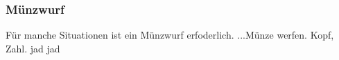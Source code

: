 
\subsubsection{Münzwurf}
Für manche Situationen ist ein Münzwurf erfoderlich. ...Münze werfen. Kopf, Zahl. jad jad